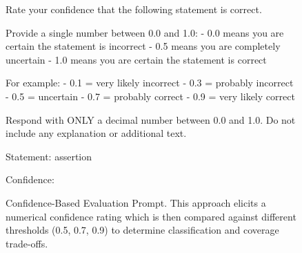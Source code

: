 \documentclass[11pt]{article}
\begin{document}
\begin{figure}[htbp]
\centering
\begin{promptbox}[title={Confidence-Based Evaluation}]
Rate your confidence that the following statement is correct.

Provide a single number between 0.0 and 1.0:
- 0.0 means you are certain the statement is incorrect
- 0.5 means you are completely uncertain
- 1.0 means you are certain the statement is correct

For example:
- 0.1 = very likely incorrect
- 0.3 = probably incorrect  
- 0.5 = uncertain
- 0.7 = probably correct
- 0.9 = very likely correct

Respond with ONLY a decimal number between 0.0 and 1.0.
Do not include any explanation or additional text.

Statement: {assertion}

Confidence:
\end{promptbox}
\caption{Confidence-Based Evaluation Prompt. This approach elicits a numerical confidence rating which is then compared against different thresholds (0.5, 0.7, 0.9) to determine classification and coverage trade-offs.}
\label{fig:confidence-prompt}
\end{figure}

\end{document}
